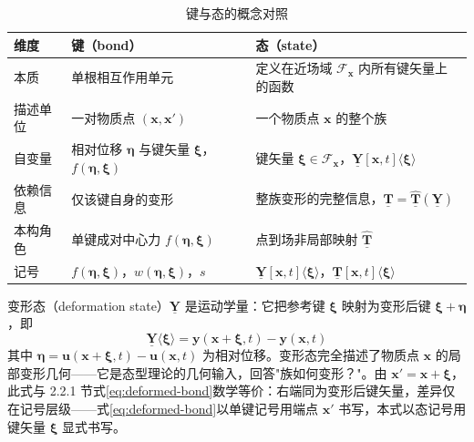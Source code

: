 \begin{table}[htbp]
  \centering
  \caption{键与态的概念对照}
  \label{tab:bond-state-comparison}
  \small
  \begin{tabular}{p{}>{\raggedright\arraybackslash}p{}>{\raggedright\arraybackslash}p{}}
    \toprule
    维度 & 键（bond） & 态（state） \\
    \midrule
    本质 & 单根相互作用单元 & 定义在近场域 $\mathcal{F}_{\mathbf{x}}$ 内所有键矢量上的函数 \\
    描述单位 & 一对物质点 $(\mathbf{x},\mathbf{x}')$ & 一个物质点 $\mathbf{x}$ 的整个族 \\
    自变量 & 相对位移 $\boldsymbol{\eta}$ 与键矢量 $\boldsymbol{\xi}$，$f(\boldsymbol{\eta},\boldsymbol{\xi})$ & 键矢量 $\boldsymbol{\xi}\in\mathcal{F}_{\mathbf{x}}$，$\underline{\mathbf{Y}}[\mathbf{x},t]\langle\boldsymbol{\xi}\rangle$ \\
    依赖信息 & 仅该键自身的变形 & 整族变形的完整信息，$\underline{\mathbf{T}}=\hat{\underline{\mathbf{T}}}(\underline{\mathbf{Y}})$ \\
    本构角色 & 单键成对中心力 $f(\boldsymbol{\eta},\boldsymbol{\xi})$ & 点到场非局部映射 $\hat{\underline{\mathbf{T}}}$ \\
    记号 & $f(\boldsymbol{\eta},\boldsymbol{\xi})$，$w(\boldsymbol{\eta},\boldsymbol{\xi})$，$s$ & $\underline{\mathbf{Y}}[\mathbf{x},t]\langle\boldsymbol{\xi}\rangle$，$\underline{\mathbf{T}}[\mathbf{x},t]\langle\boldsymbol{\xi}\rangle$ \\
    \bottomrule
  \end{tabular}
\end{table}

变形态（deformation state）$\underline{\mathbf{Y}}$ 是运动学量：它把参考键 $\boldsymbol{\xi}$ 映射为变形后键 $\boldsymbol{\xi}+\boldsymbol{\eta}$，即
\begin{equation}
  \underline{\mathbf{Y}}\langle\boldsymbol{\xi}\rangle=\mathbf{y}(\mathbf{x}+\boldsymbol{\xi},t)-\mathbf{y}(\mathbf{x},t)
  \label{eq:state-deformation-ch02}
\end{equation}
其中 $\boldsymbol{\eta}=\mathbf{u}(\mathbf{x}+\boldsymbol{\xi},t)-\mathbf{u}(\mathbf{x},t)$ 为相对位移。变形态完全描述了物质点 $\mathbf{x}$ 的局部变形几何——它是态型理论的几何输入，回答"族如何变形？"。由 $\mathbf{x}'=\mathbf{x}+\boldsymbol{\xi}$，此式与 2.2.1 节式\eqref{eq:deformed-bond}数学等价：右端同为变形后键矢量，差异仅在记号层级——式\eqref{eq:deformed-bond}以单键记号用端点 $\mathbf{x}'$ 书写，本式以态记号用键矢量 $\boldsymbol{\xi}$ 显式书写。

